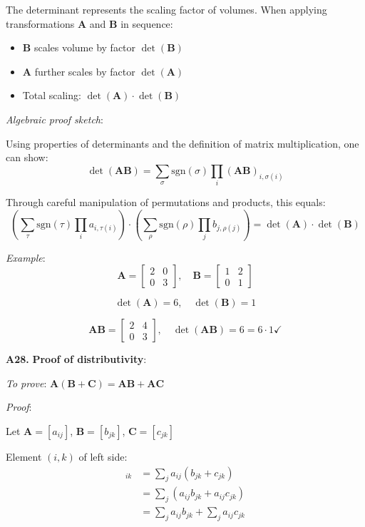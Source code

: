 \documentclass[12pt,a4paper]{article}
\theoremstyle{definition}
\begin{document}
The determinant represents the scaling factor of volumes. When applying transformations $\mathbf{A}$ and $\mathbf{B}$ in sequence:
\begin{itemize}
\item $\mathbf{B}$ scales volume by factor $\det(\mathbf{B})$
\item $\mathbf{A}$ further scales by factor $\det(\mathbf{A})$
\item Total scaling: $\det(\mathbf{A}) \cdot \det(\mathbf{B})$
\end{itemize}

\textit{Algebraic proof sketch}:

Using properties of determinants and the definition of matrix multiplication, one can show:
\[
\det(\mathbf{AB}) = \sum_{\sigma} \text{sgn}(\sigma) \prod_{i} (\mathbf{AB})_{i,\sigma(i)}
\]

Through careful manipulation of permutations and products, this equals:
\[
\left(\sum_{\tau} \text{sgn}(\tau) \prod_{i} a_{i,\tau(i)}\right) \cdot \left(\sum_{\rho} \text{sgn}(\rho) \prod_{j} b_{j,\rho(j)}\right) = \det(\mathbf{A}) \cdot \det(\mathbf{B})
\]

\textit{Example}:
\[
\mathbf{A} = \begin{bmatrix} 2 & 0 \\ 0 & 3 \end{bmatrix}, \quad \mathbf{B} = \begin{bmatrix} 1 & 2 \\ 0 & 1 \end{bmatrix}
\]

\[
\det(\mathbf{A}) = 6, \quad \det(\mathbf{B}) = 1
\]

\[
\mathbf{AB} = \begin{bmatrix} 2 & 4 \\ 0 & 3 \end{bmatrix}, \quad \det(\mathbf{AB}) = 6 = 6 \cdot 1 \checkmark
\]

\textbf{A28.} \textbf{Proof of distributivity}:

\textit{To prove}: $\mathbf{A}(\mathbf{B} + \mathbf{C}) = \mathbf{AB} + \mathbf{AC}$

\textit{Proof}:

Let $\mathbf{A} = [a_{ij}]$, $\mathbf{B} = [b_{jk}]$, $\mathbf{C} = [c_{jk}]$

Element $(i,k)$ of left side:
\begin{align*}
[\mathbf{A}(\mathbf{B} + \mathbf{C})]_{ik} &= \sum_{j} a_{ij}(b_{jk} + c_{jk}) \\
&= \sum_{j} (a_{ij}b_{jk} + a_{ij}c_{jk}) \\
&= \sum_{j} a_{ij}b_{jk} + \sum_{j} a_{ij}c_{jk}
\end{align*}
\end{document}
